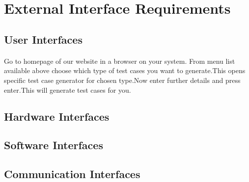 \documentclass{article}
\begin{document}
\section{External Interface Requirements}
\subsection{User Interfaces}
\paragraph{}
Go to homepage of our website in a browser on your system. From menu list available
above choose which type of test cases you want to generate.This opens specific test
case generator for chosen type.Now enter further details and press enter.This will 
generate test cases for you.

\subsection{Hardware Interfaces}
\paragraph{}

\subsection{Software Interfaces}
\paragraph{}

\subsection{Communication Interfaces}
\paragraph{}
\end{document}
